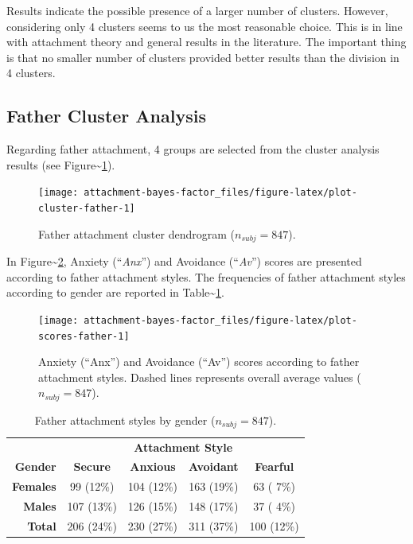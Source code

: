 \documentclass[
]{book}
\begin{document}
Results indicate the possible presence of a larger number of clusters. However, considering only 4 clusters seems to us the most reasonable choice. This is in line with attachment theory and general results in the literature. The important thing is that no smaller number of clusters provided better results than the division in 4 clusters.

\hypertarget{father-cluster-analysis}{%
\subsection{Father Cluster Analysis}\label{father-cluster-analysis}}

Regarding father attachment, 4 groups are selected from the cluster analysis results (see Figure\textasciitilde\ref{fig:plot-cluster-father}).

\begin{figure}

{\centering \texttt{[image: attachment-bayes-factor\_files/figure-latex/plot-cluster-father-1]} 

}

\caption{Father attachment cluster dendrogram ($n_{subj} = 847$).}\label{fig:plot-cluster-father}
\end{figure}

In Figure\textasciitilde\ref{fig:plot-scores-father}, Anxiety (``\emph{Anx}'') and Avoidance (``\emph{Av}'') scores are presented according to father attachment styles. The frequencies of father attachment styles according to gender are reported in Table\textasciitilde\ref{tab:table-cluster-father}.

\begin{figure}

{\centering \texttt{[image: attachment-bayes-factor\_files/figure-latex/plot-scores-father-1]} 

}

\caption{Anxiety (“Anx”) and Avoidance (“Av”) scores according to father attachment styles. Dashed lines represents overall average values ($n_{subj} = 847$).}\label{fig:plot-scores-father}
\end{figure}

\begin{table}[!h]

\caption{\label{tab:table-cluster-father}Father attachment styles by gender ($n_{subj} = 847$).}
\centering
\begin{tabular}[t]{>{}rcccc}
\toprule
\multicolumn{1}{c}{\textbf{ }} & \multicolumn{4}{c}{\textbf{Attachment Style}} \\
\cmidrule(l{3pt}r{3pt}){2-5}
\textbf{Gender} & \textbf{Secure} & \textbf{Anxious} & \textbf{Avoidant} & \textbf{Fearful}\\
\midrule
\textbf{Females} & 99 (12\%) & 104 (12\%) & 163 (19\%) & 63 ( 7\%)\\
\textbf{Males} & 107 (13\%) & 126 (15\%) & 148 (17\%) & 37 ( 4\%)\\
\textbf{Total} & 206 (24\%) & 230 (27\%) & 311 (37\%) & 100 (12\%)\\
\bottomrule
\end{tabular}
\end{table}
\end{document}
